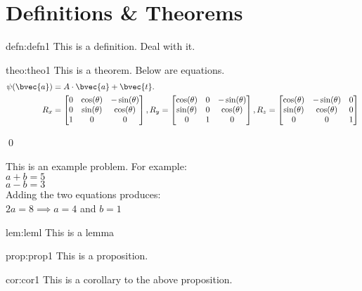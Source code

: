 \vspace{5cm} 

\section{Definitions \& Theorems}
\begin{defn}[EasyClass]{defn:defn1}
This is a definition. Deal with it.
\end{defn}

\begin{theo}{theo:theo1}
This is a theorem. Below are equations.
\begin{align}\label{eq:multi-equations}
    \psi(\bvec{a}) &= A\cdot \bvec{a} + \bvec{t}.\\
    R_x &=  \begin{bmatrix} 
            0 & \cos(\theta) & -\sin(\theta)\\
            0 & \sin(\theta) & \cos(\theta)\\
            1 & 0 & 0
         \end{bmatrix}, 
    R_y =  \begin{bmatrix} 
            \cos(\theta) & 0 & -\sin(\theta)\\
            \sin(\theta) & 0 & \cos(\theta)\\
            0 & 1 & 0
         \end{bmatrix}, 
    R_z =  \begin{bmatrix} 
            \cos(\theta) & -\sin(\theta) & 0\\
            \sin(\theta) & \cos(\theta) & 0 \\
            0 & 0 & 1
         \end{bmatrix} 
\end{align}

\qed
\end{theo}

\begin{ex}
    This is an example problem. For example: \\
    $a + b = 5$ \\
    $a - b = 3$ \\
    Adding the two equations produces: \\
    $2a = 8 \implies a = 4$ and $b = 1$
\end{ex}

\begin{lem}{lem:leml}
This is a lemma
\end{lem}


\begin{prop}{prop:prop1}
This is a proposition.
\end{prop}

\begin{cor}{cor:cor1}
This is a corollary to the above proposition.
\end{cor}






